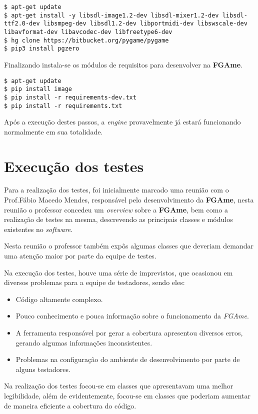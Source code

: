 \begin{lstlisting}
$ apt-get update
$ apt-get install -y libsdl-image1.2-dev libsdl-mixer1.2-dev libsdl-ttf2.0-dev libsmpeg-dev libsdl1.2-dev libportmidi-dev libswscale-dev libavformat-dev libavcodec-dev libfreetype6-dev
$ hg clone https://bitbucket.org/pygame/pygame
$ pip3 install pgzero
\end{lstlisting}

Finalizando instala-se os módulos de requisitos para desenvolver na \textbf{FGAme}.

\begin{lstlisting}
$ apt-get update
$ pip install image
$ pip install -r requirements-dev.txt
$ pip install -r requirements.txt
\end{lstlisting}

Após a execução destes passos, a \textit{engine} provavelmente já estará funcionando normalmente em sua totalidade.

\section{Execução dos testes}

Para a realização dos testes, foi inicialmente marcado uma reunião com o Prof.Fábio Macedo Mendes, responsável pelo desenvolvimento da \textbf{FGAme}, nesta reunião o professor concedeu um \textit{overview} sobre a \textbf{FGAme}, bem como a realização de testes na mesma, descrevendo as principais classes e módulos existentes no \textit{software}.

Nesta reunião o professor também expôs algumas classes que deveriam demandar uma atenção maior por parte da equipe de testes.

Na execução dos testes, houve uma série de imprevistos, que ocasionou em diversos problemas para a equipe de testadores, sendo eles:

\begin{itemize}
\item Código altamente complexo.
\item Pouco conhecimento e pouca informação sobre o funcionamento da \textit{FGAme}.
\item A ferramenta responsável por gerar a cobertura apresentou diversos erros, gerando algumas informações inconsistentes.
\item Problemas na configuração do ambiente de desenvolvimento por parte de alguns testadores.
\end{itemize}

Na realização dos testes focou-se em classes que apresentavam uma melhor legibilidade, além de evidentemente, focou-se em classes que poderiam aumentar de maneira eficiente a cobertura do código.


